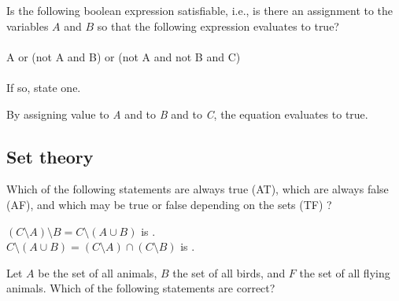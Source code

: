 \documentclass{ximera}
\begin{document}
\begin{question}
Is the following boolean expression satisfiable, i.e., is there an assignment to the variables $A$ and $B$ so that the following expression evaluates to true?  \\
\\
A or (not A and B) or (not A and not B and C)\\
\\
If so, state one.
\begin{solution}
By assigning value  to \emph{A} and  to \emph{B} and  to \emph{C}, the equation evaluates to true.
\end{solution}
\end{question}

\subsection*{Set theory}

\begin{question}
Which of the following statements are always true (AT), which are always false (AF), and which may be true or false depending on the sets (TF) ?
\begin{solution}
$(C \setminus A) \setminus B = C \setminus (A \cup B)$ is . \ \\
$ C \setminus (A \cup B) = (C \setminus A)  \cap (C \setminus B)$ is .
\end{solution}
\end{question}

\begin{question}
Let $A$ be the set of all animals, $B$ the set of all birds, and $F$
the set of all flying animals. Which of the following statements are correct?
\begin{solution}
\begin{multiple-choice}
\end{multiple-choice}
\end{solution}
\end{question}
\end{document}
